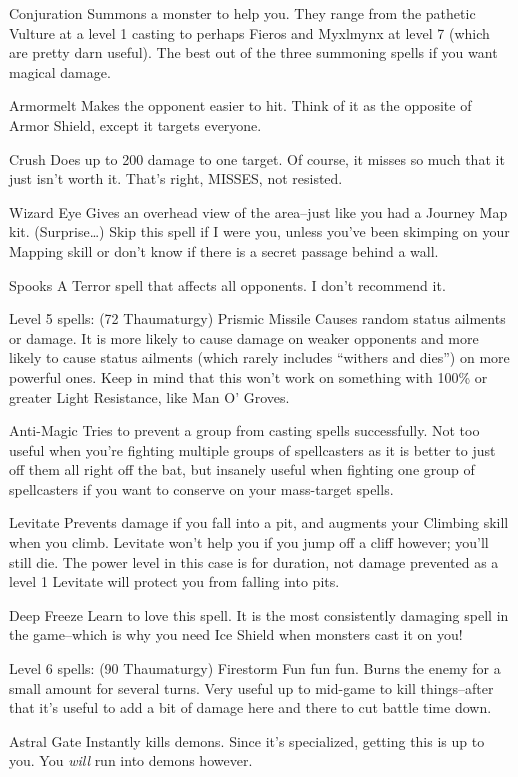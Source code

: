 \documentclass[12pt]{article}
\begin{document}
Conjuration Summons a monster to help you. They range from the pathetic
Vulture at a level 1 casting to perhaps Fieros and Myxlmynx at level 7
(which are pretty darn useful). The best out of the three summoning
spells if you want magical damage.

Armormelt Makes the opponent easier to hit. Think of it as the opposite
of Armor Shield, except it targets everyone.

Crush Does up to 200 damage to one target. Of course, it misses so much
that it just isn't worth it. That's right, MISSES, not resisted.

Wizard Eye Gives an overhead view of the area--just like you had a
Journey Map kit. (Surprise\ldots{}) Skip this spell if I were you,
unless you've been skimping on your Mapping skill or don't know if there
is a secret passage behind a wall.

Spooks A Terror spell that affects all opponents. I don't recommend it.

Level 5 spells: (72 Thaumaturgy) Prismic Missile Causes random status
ailments or damage. It is more likely to cause damage on weaker
opponents and more likely to cause status ailments (which rarely
includes ``withers and dies'') on more powerful ones. Keep in mind that
this won't work on something with 100\% or greater Light Resistance,
like Man O' Groves.

Anti-Magic Tries to prevent a group from casting spells successfully.
Not too useful when you're fighting multiple groups of spellcasters as
it is better to just off them all right off the bat, but insanely useful
when fighting one group of spellcasters if you want to conserve on your
mass-target spells.

Levitate Prevents damage if you fall into a pit, and augments your
Climbing skill when you climb. Levitate won't help you if you jump off a
cliff however; you'll still die. The power level in this case is for
duration, not damage prevented as a level 1 Levitate will protect you
from falling into pits.

Deep Freeze Learn to love this spell. It is the most consistently
damaging spell in the game--which is why you need Ice Shield when
monsters cast it on you!

Level 6 spells: (90 Thaumaturgy) Firestorm Fun fun fun. Burns the enemy
for a small amount for several turns. Very useful up to mid-game to kill
things--after that it's useful to add a bit of damage here and there to
cut battle time down.

Astral Gate Instantly kills demons. Since it's specialized, getting this
is up to you. You \emph{will} run into demons however.
\end{document}

